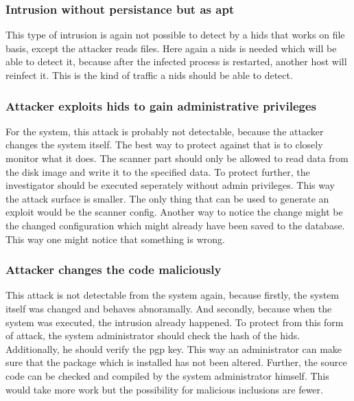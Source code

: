 \documentclass[
	a4paper,					%
	10pt,							%
	twoside,					%
	openright,				%
	notitlepage,			%
	parskip=half,			%
]{scrreprt}					%
\begin{document}
\subsubsection{Intrusion without persistance but as apt}
\label{sec:defense:nopersistanceapt}

This type of intrusion is again not possible to detect by a \gls{hids} that works on file basis, except the attacker reads files. Here again a \gls{nids} is needed which will be able to detect it, because after the infected process is restarted, another host will reinfect it. This is the kind of traffic a \gls{nids} should be able to detect.

\subsubsection{Attacker exploits \gls{hids} to gain administrative privileges}
\label{sec:defense:exploitforroot}

For the system, this attack is probably not detectable, because the attacker changes the system itself. The best way to protect against that is to closely monitor what it does. The scanner part should only be allowed to read data from the disk image and write it to the specified data. To protect further, the investigator should be executed seperately without admin privileges. This way the attack surface is smaller. The only thing that can be used to generate an exploit would be the scanner config. Another way to notice the change might be the changed configuration which might already have been saved to the database. This way one might notice that something is wrong.

\subsubsection{Attacker changes the code maliciously}
\label{sec:defense:codechange}

This attack is not detectable from the system again, because firstly, the system itself was changed and behaves abnoramally. And secondly, because when the system was executed, the intrusion already happened. To protect from this form of attack, the system administrator should check the hash of the \gls{hids}. Additionally, he should verify the \gls{pgp} key. This way an administrator can make sure that the package which is installed has not been altered. Further, the source code can be checked and compiled by the system administrator himself. This would take more work but the possibility for malicious inclusions are fewer. 
\end{document}
